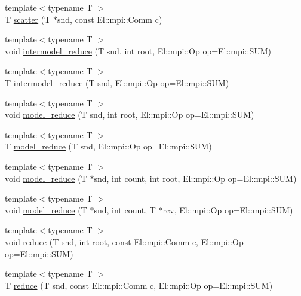 \begin{DoxyCompactItemize}
\item 
{\footnotesize template$<$typename T $>$ }\\T \hyperlink{classlbann_1_1lbann__comm_a4918100a99e03a6bca3ec304cb282172}{scatter} (T $\ast$snd, const El\+::mpi\+::\+Comm c)
\item 
{\footnotesize template$<$typename T $>$ }\\void \hyperlink{classlbann_1_1lbann__comm_a485715aa8e0e05d9ced78346342692a5}{intermodel\+\_\+reduce} (T snd, int root, El\+::mpi\+::\+Op op=El\+::mpi\+::\+S\+UM)
\item 
{\footnotesize template$<$typename T $>$ }\\T \hyperlink{classlbann_1_1lbann__comm_a4861b03da73bbc8fec61a10ebf129ee0}{intermodel\+\_\+reduce} (T snd, El\+::mpi\+::\+Op op=El\+::mpi\+::\+S\+UM)
\item 
{\footnotesize template$<$typename T $>$ }\\void \hyperlink{classlbann_1_1lbann__comm_a4903dbabf8f649abc2734510d434eed2}{model\+\_\+reduce} (T snd, int root, El\+::mpi\+::\+Op op=El\+::mpi\+::\+S\+UM)
\item 
{\footnotesize template$<$typename T $>$ }\\T \hyperlink{classlbann_1_1lbann__comm_aac992e520cfbfb5f7b403ee6c9334b0e}{model\+\_\+reduce} (T snd, El\+::mpi\+::\+Op op=El\+::mpi\+::\+S\+UM)
\item 
{\footnotesize template$<$typename T $>$ }\\void \hyperlink{classlbann_1_1lbann__comm_aa605a57eb9132fc575e90b1ac825cf0b}{model\+\_\+reduce} (T $\ast$snd, int count, int root, El\+::mpi\+::\+Op op=El\+::mpi\+::\+S\+UM)
\item 
{\footnotesize template$<$typename T $>$ }\\void \hyperlink{classlbann_1_1lbann__comm_aba37a188f88277b23583aa8bea2e2f04}{model\+\_\+reduce} (T $\ast$snd, int count, T $\ast$rcv, El\+::mpi\+::\+Op op=El\+::mpi\+::\+S\+UM)
\item 
{\footnotesize template$<$typename T $>$ }\\void \hyperlink{classlbann_1_1lbann__comm_ab8a2261394c978aa7e4b74ecebc739a8}{reduce} (T snd, int root, const El\+::mpi\+::\+Comm c, El\+::mpi\+::\+Op op=El\+::mpi\+::\+S\+UM)
\item 
{\footnotesize template$<$typename T $>$ }\\T \hyperlink{classlbann_1_1lbann__comm_a982adc23d7e6e6224f8bbd846672e429}{reduce} (T snd, const El\+::mpi\+::\+Comm c, El\+::mpi\+::\+Op op=El\+::mpi\+::\+S\+UM)

\end{DoxyCompactItemize}
